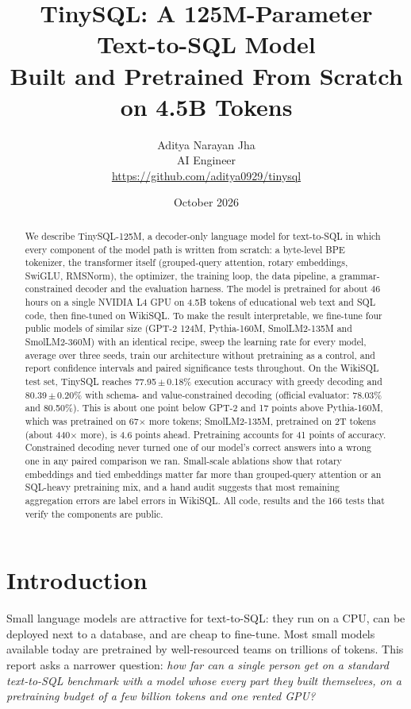 \documentclass[11pt]{article}
\title{\textbf{TinySQL: A 125M-Parameter Text-to-SQL Model\\Built and Pretrained From Scratch on 4.5B Tokens}}
\author{Aditya Narayan Jha\\AI Engineer\\\url{https://github.com/aditya0929/tinysql}}
\date{October 2026}
\begin{document}
\maketitle

\begin{abstract}
We describe TinySQL-125M, a decoder-only language model for text-to-SQL in which every component of the model path is written from scratch: a byte-level BPE tokenizer, the transformer itself (grouped-query attention, rotary embeddings, SwiGLU, RMSNorm), the optimizer, the training loop, the data pipeline, a grammar-constrained decoder and the evaluation harness. The model is pretrained for about 46 hours on a single NVIDIA L4 GPU on 4.5B tokens of educational web text and SQL code, then fine-tuned on WikiSQL. To make the result interpretable, we fine-tune four public models of similar size (GPT-2 124M, Pythia-160M, SmolLM2-135M and SmolLM2-360M) with an identical recipe, sweep the learning rate for every model, average over three seeds, train our architecture without pretraining as a control, and report confidence intervals and paired significance tests throughout. On the WikiSQL test set, TinySQL reaches 77.95\,$\pm$\,0.18\% execution accuracy with greedy decoding and 80.39\,$\pm$\,0.20\% with schema- and value-constrained decoding (official evaluator: 78.03\% and 80.50\%). This is about one point below GPT-2 and 17 points above Pythia-160M, which was pretrained on 67$\times$ more tokens; SmolLM2-135M, pretrained on 2T tokens (about 440$\times$ more), is 4.6 points ahead. Pretraining accounts for 41 points of accuracy. Constrained decoding never turned one of our model's correct answers into a wrong one in any paired comparison we ran. Small-scale ablations show that rotary embeddings and tied embeddings matter far more than grouped-query attention or an SQL-heavy pretraining mix, and a hand audit suggests that most remaining aggregation errors are label errors in WikiSQL. All code, results and the 166 tests that verify the components are public.
\end{abstract}

\section{Introduction}

Small language models are attractive for text-to-SQL: they run on a CPU, can be deployed next to a database, and are cheap to fine-tune. Most small models available today are pretrained by well-resourced teams on trillions of tokens. This report asks a narrower question: \emph{how far can a single person get on a standard text-to-SQL benchmark with a model whose every part they built themselves, on a pretraining budget of a few billion tokens and one rented GPU?}
\end{document}
